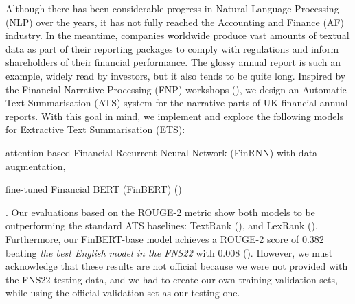 Although there has been considerable progress in Natural Language Processing (NLP) over the years, it has not fully reached the Accounting and Finance (AF) industry.
In the meantime, companies worldwide produce vast amounts of textual data as part of their reporting packages to comply with regulations and inform shareholders of their financial performance.
The glossy annual report is such an example, widely read by investors, but it also tends to be quite long.
Inspired by the Financial Narrative Processing (FNP) workshops (\cite{zmandar-etal-2021-financial, fnp-2022-financial}),
we design an Automatic Text Summarisation (ATS) system for the narrative parts of UK financial annual reports.
With this goal in mind, we implement and explore the following models for Extractive Text Summarisation (ETS):
\begin{enumerate*}
    \item attention-based Financial Recurrent Neural Network (FinRNN) with data augmentation,
    \item fine-tuned Financial BERT (FinBERT) (\cite{yang2020finbert})
\end{enumerate*}.
Our evaluations based on the ROUGE-2 metric show both models to be outperforming the standard ATS baselines: TextRank (\cite{mihalcea-tarau-2004-textrank}), and LexRank (\cite{Erkan2004LexRankGC}).
Furthermore, our FinBERT-base model achieves a ROUGE-2 score of $0.382$ beating \emph{the best English model in the FNS22} with $0.008$ (\cite{el-haj-etal-2022-financial}).
However, we must acknowledge that these results are not official because we were not provided with the FNS22 testing data,
and we had to create our own training-validation sets, while using the official validation set as our testing one.